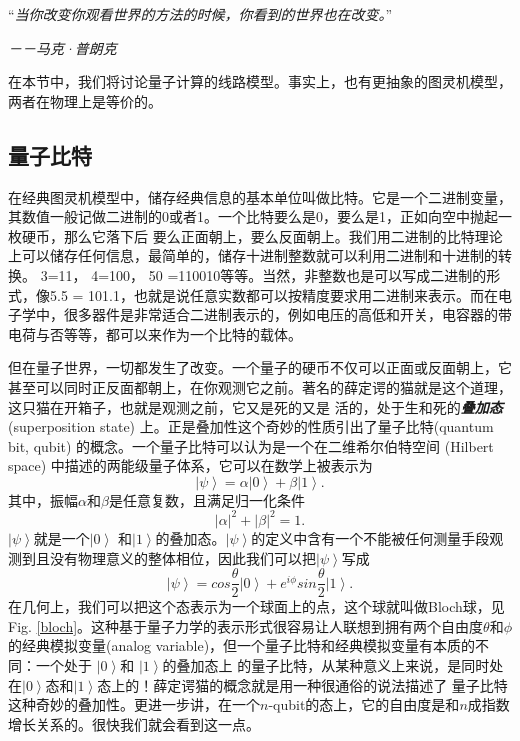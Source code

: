     “\emph{当你改变你观看世界的方法的时候，你看到的世界也在改变。}”

 \hspace{23em} \emph{－－马克·普朗克}

    在本节中，我们将讨论量子计算的线路模型。事实上，也有更抽象的图灵机模型，两者在物理上是等价的。

    \subsection{量子比特}

    在经典图灵机模型中，储存经典信息的基本单位叫做比特。它是一个二进制变量，其数值一般记做二进制的0或者1。一个比特要么是0，要么是1，正如向空中抛起一枚硬币，那么它落下后
    要么正面朝上，要么反面朝上。我们用二进制的比特理论上可以储存任何信息，最简单的，储存十进制整数就可以利用二进制和十进制的转换。 3=11， 4=100， 50 =110010等等。当然，非整数也是可以写成二进制的形式，像5.5 = 101.1，也就是说任意实数都可以按精度要求用二进制来表示。而在电子学中，很多器件是非常适合二进制表示的，例如电压的高低和开关，电容器的带电荷与否等等，都可以来作为一个比特的载体。

但在量子世界，一切都发生了改变。一个量子的硬币不仅可以正面或反面朝上，它甚至可以同时正反面都朝上，在你观测它之前。著名的薛定谔的猫就是这个道理，这只猫在开箱子，也就是观测之前，它又是死的又是
活的，处于生和死的\emph{\textbf{叠加态}} (superposition state) 上。正是叠加性这个奇妙的性质引出了量子比特(quantum bit, qubit) 的概念。一个量子比特可以认为是一个在二维希尔伯特空间 (Hilbert space) 中描述的两能级量子体系，它可以在数学上被表示为
\begin{equation}
           \left\vert \psi \right\rangle= \alpha  \left\vert 0 \right\rangle + \beta  \left\vert 1 \right\rangle.
 \end{equation}
其中，振幅$\alpha$和$\beta$是任意复数，且满足归一化条件
\begin{equation}
          |\alpha|^2 + |\beta|^2 =1.
 \end{equation}
$\left\vert \psi \right\rangle$就是一个$\left\vert 0 \right\rangle$ 和$\left\vert 1 \right\rangle$的叠加态。$\left\vert \psi \right\rangle$的定义中含有一个不能被任何测量手段观测到且没有物理意义的整体相位，因此我们可以把$\left\vert \psi \right\rangle$写成
 \begin{equation}
           \left\vert \psi \right\rangle= cos\frac{\theta}{2}  \left\vert 0 \right\rangle + e^{i\phi}sin\frac{\theta}{2}  \left\vert 1 \right\rangle.
 \end{equation}
在几何上，我们可以把这个态表示为一个球面上的点，这个球就叫做Bloch球，见Fig. \ref{bloch}。这种基于量子力学的表示形式很容易让人联想到拥有两个自由度$\theta$和$\phi$的经典模拟变量(analog variable)，但一个量子比特和经典模拟变量有本质的不同：一个处于 $\left\vert 0 \right\rangle$和 $\left\vert 1 \right\rangle$的叠加态上
的量子比特，从某种意义上来说，是同时处在$\left\vert 0 \right\rangle$态和$\left\vert 1 \right\rangle$态上的！薛定谔猫的概念就是用一种很通俗的说法描述了
量子比特这种奇妙的叠加性。更进一步讲，在一个$n$-qubit的态上，它的自由度是和$n$成指数增长关系的。很快我们就会看到这一点。

